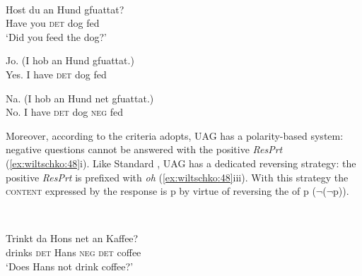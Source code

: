 \documentclass[output=paper]{LSP/langsci}
\begin{document}
\ea\label{ex:wiltschko:47}
\settowidth{}
\\
\begin{xlist}
  \gll Host  du   an   Hund  gfuattat?    \\
  Have you \textsc{det} dog     fed\\
  \glt ‘Did you feed the dog?’

\begin{xlista}
 \ex
  \gll Jo.   (I hob   an    Hund gfuattat.)  \\
	Yes. I  have \textsc{det}  dog    fed\\

  \ex
  \gll Na. (I hob   an   Hund  net   gfuattat.)  \\
    No. I  have \textsc{det}  dog    \textsc{neg} fed\\
  \end{xlista}
\end{xlist}
\z

Moreover, according to the criteria \citet{holmberg:15} adopts, UAG has a polarity-based system: negative questions cannot be answered with the positive \textit{ResPrt} (\ref{ex:wiltschko:48}i). Like Standard , UAG has a dedicated  reversing strategy: the positive \textit{ResPrt} is prefixed with \textit{oh} (\ref{ex:wiltschko:48}iii). With this strategy the \textsc{content} expressed by the response is p by virtue of reversing the  of p ($¬$($¬$p)).


\ea\label{ex:wiltschko:48}
\\
\begin{xlist}
  \gll Trinkt  da    Hons  net   an      Kaffee?   \\
  drinks \textsc{det}  Hans   \textsc{neg}  \textsc{det}   coffee \\
  \glt ‘Does Hans not drink coffee?’

\begin{xlisti}
\end{xlisti}
\end{xlist}
\z
\end{document}
